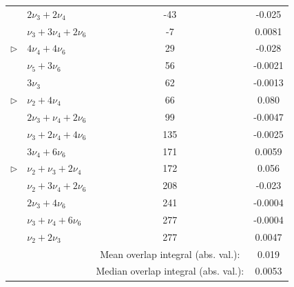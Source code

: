 \documentclass[12pt]{mitthesis}
\begin{document}
\begin{table}
\begin{tabular}{llcc}
                 & $ 2 \nu_3 +  2 \nu_4$                         &   -43 & -0.025 \\
                 & $\nu_3 +  3 \nu_4 +  2 \nu_6$                 &    -7 &  0.0081 \\
$\triangleright$ & $ 4 \nu_4 +  4 \nu_6$                         &    29 & -0.028 \\
                 & $\nu_5 +  3 \nu_6$                            &    56 & -0.0021 \\
                 & $ 3 \nu_3$                                    &    62 & -0.0013 \\
$\triangleright$ & $\nu_2 +  4 \nu_4$                            &    66 &  0.080 \\
                 & $ 2 \nu_3 + \nu_4 +  2 \nu_6$                 &    99 & -0.0047 \\
                 & $\nu_3 +  2 \nu_4 +  4 \nu_6$                 &   135 & -0.0025 \\
                 & $ 3 \nu_4 +  6 \nu_6$                         &   171 &  0.0059 \\
$\triangleright$ & $\nu_2 + \nu_3 +  2 \nu_4$                    &   172 &  0.056 \\
                 & $\nu_2 +  3 \nu_4 +  2 \nu_6$                 &   208 & -0.023 \\
                 & $ 2 \nu_3 +  4 \nu_6$                         &   241 & -0.0004 \\
                 & $\nu_3 + \nu_4 +  6 \nu_6$                    &   277 & -0.0004 \\
                 & $\nu_2 +  2 \nu_3$                            &   277 &  0.0047 \\
\midrule
& & Mean overlap integral (abs. val.): & 0.019 \\
& & Median overlap integral (abs. val.): & 0.0053 \\
  \end{tabular}\\[3mm]

\end{table}
\end{document}
